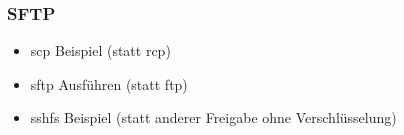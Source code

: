 \begin{frame}
\frametitle{SFTP}
\begin{itemize}
\item scp Beispiel (statt rcp)
\item sftp Ausführen (statt ftp)
\item sshfs Beispiel (statt anderer Freigabe ohne Verschlüsselung)
\end{itemize}
\end{frame}